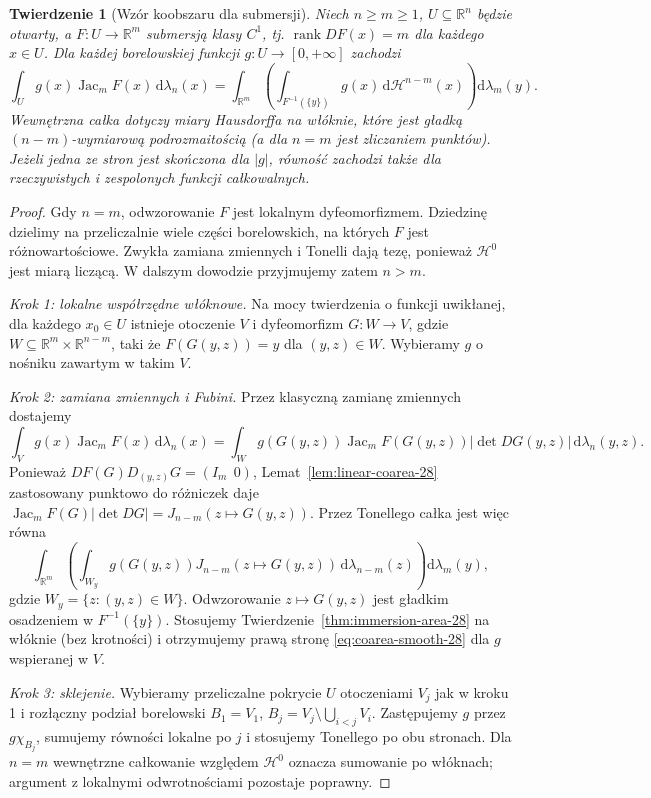 \documentclass[11pt,a4paper,oneside]{book}
\numberwithin{equation}{chapter}
\theoremstyle{plain}
\newtheorem{twierdzenie}{Twierdzenie}[chapter]
\theoremstyle{definition}
\theoremstyle{remark}
\begin{document}
\begin{twierdzenie}[Wzór koobszaru dla submersji]
\label{thm:coarea-submersion-28}
Niech $n\ge m\ge1$, $U\subseteq\mathbb R^n$
będzie otwarty, a $F:U\to\mathbb R^m$
submersją klasy $C^1$, tj.
$\operatorname{rank}DF(x)=m$ dla każdego $x\in U$.
Dla każdej borelowskiej funkcji $g:U\to[0,+\infty]$
zachodzi
\begin{equation}\label{eq:coarea-smooth-28}
 \int_U g(x)\operatorname{Jac}_mF(x)\,\mathrm d\lambda_n(x)
 =\int_{\mathbb R^m}\left(
 \int_{F^{-1}(\{y\})}g(x)\,\mathrm d\mathcal H^{n-m}(x)
 \right)\mathrm d\lambda_m(y).
\end{equation}
Wewnętrzna całka dotyczy miary Hausdorffa
na włóknie, które jest gładką
$(n-m)$-wymiarową podrozmaitością (a dla
$n=m$ jest zliczaniem punktów). Jeżeli jedna ze stron
jest skończona dla $|g|$, równość zachodzi także
dla rzeczywistych i zespolonych funkcji całkowalnych.
\end{twierdzenie}
\begin{proof}
Gdy $n=m$, odwzorowanie $F$ jest lokalnym
dyfeomorfizmem. Dziedzinę dzielimy na przeliczalnie
wiele części borelowskich, na których $F$ jest
różnowartościowe. Zwykła zamiana zmiennych i
Tonelli dają tezę, ponieważ
$\mathcal H^0$ jest miarą liczącą. W dalszym
dowodzie przyjmujemy zatem $n>m$.

\emph{Krok 1: lokalne współrzędne włóknowe.}
Na mocy twierdzenia o funkcji uwikłanej, dla
każdego $x_0\in U$ istnieje otoczenie $V$ i
dyfeomorfizm $G:W\to V$, gdzie
$W\subseteq\mathbb R^m\times\mathbb R^{n-m}$,
taki że $F(G(y,z))=y$ dla $(y,z)\in W$.
Wybieramy $g$ o nośniku zawartym w takim $V$.

\emph{Krok 2: zamiana zmiennych i Fubini.}
Przez klasyczną zamianę zmiennych dostajemy
\[
 \int_V g(x)\operatorname{Jac}_mF(x)\,\mathrm d\lambda_n(x)
 =\int_W g(G(y,z))\operatorname{Jac}_mF(G(y,z))
 |\det DG(y,z)|\,\mathrm d\lambda_n(y,z).
\]
Ponieważ $DF(G)D_{(y,z)}G=(I_m\ \ 0)$,
Lemat~\ref{lem:linear-coarea-28} zastosowany
punktowo do różniczek daje
$\operatorname{Jac}_mF(G)|\det DG|=
J_{n-m}(z\mapsto G(y,z))$.
Przez Tonellego całka jest więc równa
\[
 \int_{\mathbb R^m}\left(\int_{W_y}
 g(G(y,z))J_{n-m}(z\mapsto G(y,z))
 \,\mathrm d\lambda_{n-m}(z)\right)\mathrm d\lambda_m(y),
\]
gdzie $W_y=\{z:(y,z)\in W\}$.
Odwzorowanie $z\mapsto G(y,z)$ jest gładkim
osadzeniem w $F^{-1}(\{y\})$. Stosujemy
Twierdzenie~\ref{thm:immersion-area-28} na włóknie
(bez krotności) i otrzymujemy prawą stronę
\eqref{eq:coarea-smooth-28} dla $g$ wspieranej w $V$.

\emph{Krok 3: sklejenie.}
Wybieramy przeliczalne pokrycie $U$ otoczeniami
$V_j$ jak w kroku 1 i rozłączny podział borelowski
$B_1=V_1$, $B_j=V_j\setminus\bigcup_{i<j}V_i$.
Zastępujemy $g$ przez $g\chi_{B_j}$, sumujemy
równości lokalne po $j$ i stosujemy Tonellego
po obu stronach. Dla $n=m$ wewnętrzne całkowanie
względem $\mathcal H^0$ oznacza sumowanie po
włóknach; argument z lokalnymi odwrotnościami
pozostaje poprawny.
\end{proof}
\end{document}
